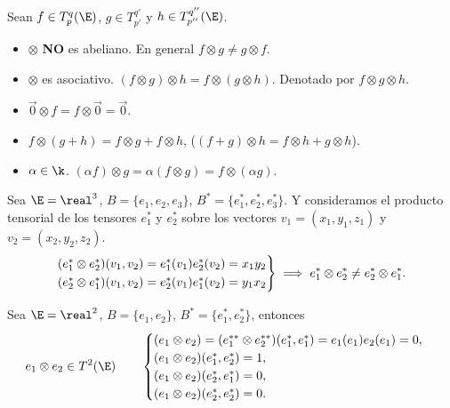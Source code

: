 \begin{prop}
    Sean $ f \in T_p^q(\E) $, $ g \in T_{p'}^{q'} $ y $ h \in T_{p''}^{q''}
    (\E) $.
    \begin{itemize}
        \item
            $ \otimes $ {\bfseries NO} es abeliano.  En general $ f
            \otimes g \neq g \otimes f $.
        \item
            $ \otimes $ es asociativo.  $ (f \otimes g) \otimes h = f
            \otimes (g \otimes h) $.  Denotado por $ f \otimes g \otimes
            h $.
        \item
            $ \vec{0} \otimes f = f \otimes \vec{0} = \vec{0} $.
        \item
            $ f \otimes (g + h) = f \otimes g + f\otimes h $, \quad ($ (f+g)
            \otimes h = f \otimes h + g \otimes h $).
        \item
            $ \alpha \in \k $.  $ (\alpha f) \otimes g = \alpha(f
            \otimes g) = f \otimes (\alpha g) $.
    \end{itemize}
\end{prop}
\begin{example}
    Sea $ \E = \real^3 $, $ B = \{e_1, e_2, e_3\} $, $ B^* = \{ e_1^*, e_2^*,
    e_3^*\} $. Y consideramos el producto tensorial de los tensores $ e_1^*
    $ y $ e_2^* $ sobre los vectores $ v_1 = (x_1, y_1, z_1) $ y $ v_2 =
    (x_2,y_2,z_2) $.
    \[
        \begin{rcases}
            (e_1^* \otimes e_2^*)(v_1, v_2) = e_1^*(v_1)e_2^*(v_2) = x_1y_2
            \\
            (e_2^* \otimes e_1^*)(v_1, v_2) = e_2^*(v_1)e_1^*(v_2) = y_1x_2
        \end{rcases}
        \implies e_1^* \otimes e_2^* \neq e_2^* \otimes e_1^*.
    \]
\end{example}
\begin{example}
    Sea $ \E = \real^2 $, $ B = \{e_1, e_2\} $, $ B^* = \{e_1^*, e_2^*\}
    $, entonces
    \[
        e_1 \otimes e_2 \in T^2(\E) \qquad
        \begin{cases}
            (e_1 \otimes e_2) = (e_1^{**} \otimes e_2^{**})(e_1^*,e_1^*)
            = e_1(e_1)e_2(e_1) = 0, \\
            (e_1 \otimes e_2)(e_1^*,e_2^*) = 1, \\
            (e_1 \otimes e_2)(e_2^*,e_1^*) = 0, \\
            (e_1 \otimes e_2)(e_2^*,e_2^*) = 0.
        \end{cases}
    \]
\end{example}
